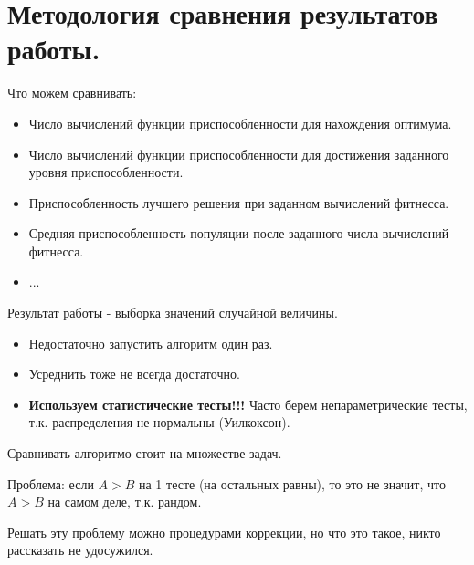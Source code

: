 \section{Методология сравнения результатов работы.}

Что можем сравнивать:
\begin{itemize}
    \item Число вычислений функции приспособленности для
    нахождения оптимума.
    \item Число вычислений функции приспособленности для
    достижения заданного уровня приспособленности.
    \item Приспособленность лучшего решения при заданном
    вычислений фитнесса.
    \item Средняя приспособленность популяции после заданного
    числа вычислений фитнесса.
    \item ...
\end{itemize}

Результат работы - выборка значений случайной величины.

\begin{itemize}
    \item Недостаточно запустить алгоритм один раз.
    \item Усреднить тоже не всегда достаточно.
    \item \textbf{Используем статистические тесты!!!}
    Часто берем непараметрические тесты, т.к. распределения
    не нормальны (Уилкоксон).
\end{itemize}

Сравнивать алгоритмо стоит на множестве задач.

Проблема: если $A > B$ на 1 тесте (на остальных равны), то это
не значит, что $A > B$ на самом деле, т.к. рандом.

Решать эту проблему можно процедурами коррекции, но что это такое,
никто рассказать не удосужился.
